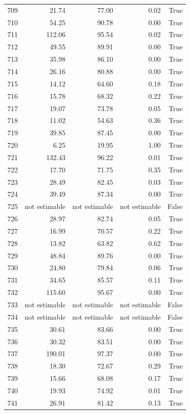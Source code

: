 \begin{longtable}{rrrrr}
709 & 21.74 & 77.00 & 0.02 & True \\
710 & 54.25 & 90.78 & 0.00 & True \\
711 & 112.06 & 95.54 & 0.02 & True \\
712 & 49.55 & 89.91 & 0.00 & True \\
713 & 35.98 & 86.10 & 0.00 & True \\
714 & 26.16 & 80.88 & 0.00 & True \\
715 & 14.12 & 64.60 & 0.18 & True \\
716 & 15.78 & 68.32 & 0.22 & True \\
717 & 19.07 & 73.78 & 0.05 & True \\
718 & 11.02 & 54.63 & 0.36 & True \\
719 & 39.85 & 87.45 & 0.00 & True \\
720 & 6.25 & 19.95 & 1.00 & True \\
721 & 132.43 & 96.22 & 0.01 & True \\
722 & 17.70 & 71.75 & 0.35 & True \\
723 & 28.49 & 82.45 & 0.03 & True \\
724 & 39.49 & 87.34 & 0.00 & True \\
725 & not estimable & not estimable & not estimable & False \\
726 & 28.97 & 82.74 & 0.05 & True \\
727 & 16.99 & 70.57 & 0.22 & True \\
728 & 13.82 & 63.82 & 0.62 & True \\
729 & 48.84 & 89.76 & 0.00 & True \\
730 & 24.80 & 79.84 & 0.06 & True \\
731 & 34.65 & 85.57 & 0.11 & True \\
732 & 115.60 & 95.67 & 0.00 & True \\
733 & not estimable & not estimable & not estimable & False \\
734 & not estimable & not estimable & not estimable & False \\
735 & 30.61 & 83.66 & 0.00 & True \\
736 & 30.32 & 83.51 & 0.00 & True \\
737 & 190.01 & 97.37 & 0.00 & True \\
738 & 18.30 & 72.67 & 0.29 & True \\
739 & 15.66 & 68.08 & 0.17 & True \\
740 & 19.93 & 74.92 & 0.01 & True \\
741 & 26.91 & 81.42 & 0.13 & True \\

\end{longtable}
